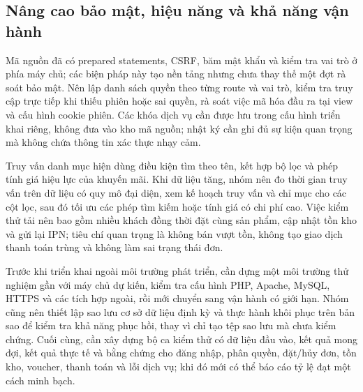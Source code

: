 \subsection{Nâng cao bảo mật, hiệu năng và khả năng vận hành}

Mã nguồn đã có prepared statements, CSRF, băm mật khẩu và kiểm tra vai trò ở phía máy chủ; các biện pháp này tạo nền tảng nhưng chưa thay thế một đợt rà soát bảo mật. Nên lập danh sách quyền theo từng route và vai trò, kiểm tra truy cập trực tiếp khi thiếu phiên hoặc sai quyền, rà soát việc mã hóa đầu ra tại view và cấu hình cookie phiên. Các khóa dịch vụ cần được lưu trong cấu hình triển khai riêng, không đưa vào kho mã nguồn; nhật ký cần ghi đủ sự kiện quan trọng mà không chứa thông tin xác thực nhạy cảm.

Truy vấn danh mục hiện dùng điều kiện tìm theo tên, kết hợp bộ lọc và phép tính giá hiệu lực của khuyến mãi. Khi dữ liệu tăng, nhóm nên đo thời gian truy vấn trên dữ liệu có quy mô đại diện, xem kế hoạch truy vấn và chỉ mục cho các cột lọc, sau đó tối ưu các phép tìm kiếm hoặc tính giá có chi phí cao. Việc kiểm thử tải nên bao gồm nhiều khách đồng thời đặt cùng sản phẩm, cập nhật tồn kho và gửi lại IPN; tiêu chí quan trọng là không bán vượt tồn, không tạo giao dịch thanh toán trùng và không làm sai trạng thái đơn.

Trước khi triển khai ngoài môi trường phát triển, cần dựng một môi trường thử nghiệm gần với máy chủ dự kiến, kiểm tra cấu hình PHP, Apache, MySQL, HTTPS và các tích hợp ngoài, rồi mới chuyển sang vận hành có giới hạn. Nhóm cũng nên thiết lập sao lưu cơ sở dữ liệu định kỳ và thực hành khôi phục trên bản sao để kiểm tra khả năng phục hồi, thay vì chỉ tạo tệp sao lưu mà chưa kiểm chứng. Cuối cùng, cần xây dựng bộ ca kiểm thử có dữ liệu đầu vào, kết quả mong đợi, kết quả thực tế và bằng chứng cho đăng nhập, phân quyền, đặt/hủy đơn, tồn kho, voucher, thanh toán và lỗi dịch vụ; khi đó mới có thể báo cáo tỷ lệ đạt một cách minh bạch.


